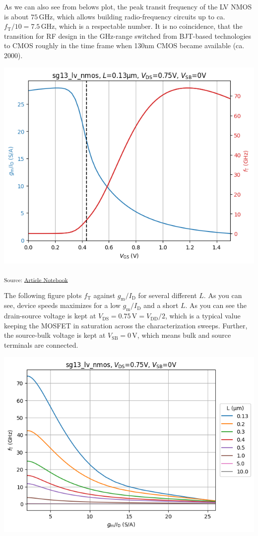 \documentclass[
  a4paper,
  DIV=11,
  numbers=noendperiod]{scrartcl}
\begin{document}
As we can also see from belows plot, the peak transit frequency of the
LV NMOS is about \(75\,\text{GHz}\), which allows building
radio-frequency circuits up to ca.
\(f_\mathrm{T} / 10 = 7.5\,\text{GHz}\), which is a respectable number.
It is no coincidence, that the transition for RF design in the GHz-range
switched from BJT-based technologies to CMOS roughly in the time frame
when 130nm CMOS became available (ca. 2000).

\includegraphics{index_files/figure-latex/.-sizing-techsweep_sg13_plots_nmos-cell-6-output-1.png}

\textsubscript{Source:
\href{https://iic-jku.github.io/analog-circuit-design/index.qmd.html}{Article
Notebook}}

The following figure plots \(f_\mathrm{T}\) against
\(g_\mathrm{m}/I_\mathrm{D}\) for several different \(L\). As you can
see, device speeds maximizes for a low \(g_\mathrm{m}/I_\mathrm{D}\) and
a short \(L\). As you can see the drain-source voltage is kept at
\(V_\mathrm{DS}= 0.75\,\text{V} = V_\mathrm{DD}/ 2\), which is a typical
value keeping the MOSFET in saturation across the characterization
sweeps. Further, the source-bulk voltage is kept at
\(V_\mathrm{SB} = 0\,\text{V}\), which means bulk and source terminals
are connected.

\includegraphics{index_files/figure-latex/.-sizing-techsweep_sg13_plots_nmos-cell-9-output-1.png}
\end{document}
